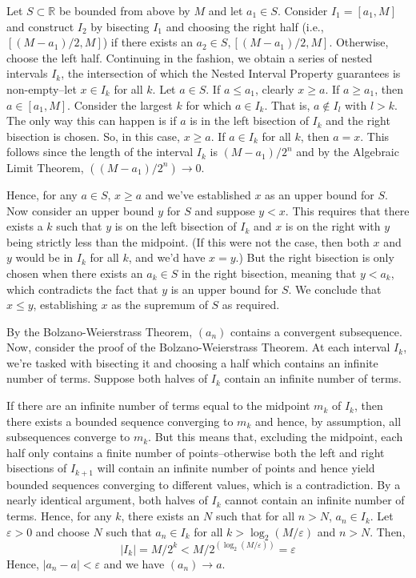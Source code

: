 \documentclass[a4paper]{report}
\newenvironment{ex}[1]
    {\noindent{\large \bf Exercise #1.}}{\vspace{0.5cm}}
\begin{document}
\begin{ex}{2.5.4}
  Let $S \subset \mathbb{R}$ be bounded from above by $M$ and let $a_1 \in S$. Consider $I_1 = [a_1 , M]$ and construct
  $I_2$ by bisecting $I_1$ and choosing the right half (i.e., $[(M-a_1)/2, M]$) if there exists an $a_2 \in S, [(M-a_1)/2, M]$. Otherwise, choose the left half. Continuing in the fashion, we obtain a series of nested intervals $I_k$, the intersection of which the Nested Interval Property guarantees is non-empty--let $x \in I_k$ for all $k$. Let $a \in S$. If $a \leq a_1$, clearly $x \geq a$. If $a \geq a_1$, then $a \in [a_1, M]$. Consider the largest $k$ for which
  $a \in I_k$. That is, $a \notin I_{l}$ with $l > k$. The only way this can happen is if $a$ is in the left bisection
  of $I_k$ and the right bisection is chosen. So, in this case, $x \geq a$. If $a \in I_k$ for all $k$, then $a = x$. This follows since the length of the interval $I_k$ is $(M-a_1)/2^n$ and by the Algebraic Limit Theorem, $\left((M-a_1)/2^n\right) \rightarrow 0$.

  Hence, for any $a \in S$, $x \geq a$ and we've established $x$ as an upper bound for $S$. Now consider an upper bound $y$ for $S$ and suppose $y < x$. This requires that there exists a $k$ such that $y$ is on the left bisection of $I_k$ and $x$ is on the right with $y$ being strictly less than the midpoint. (If this were not the case, then both $x$ and $y$ would be in $I_k$ for all $k$, and we'd have $x = y$.) But the right bisection is only chosen when there exists an $a_k \in S$ in the right bisection, meaning that $y < a_k$, which contradicts the fact that $y$ is an upper bound for $S$. We conclude that $x \leq y$, establishing $x$ as the supremum of $S$ as required.
\end{ex}

\begin{ex}{2.5.5}
  By the Bolzano-Weierstrass Theorem, $(a_n)$ contains a convergent subsequence. Now, consider the proof of the Bolzano-Weierstrass Theorem. At each interval $I_k$, we're tasked with bisecting it and choosing a half which contains an infinite number of terms. Suppose both halves of $I_k$ contain an infinite number of terms.

  If there are an infinite number of terms equal to the midpoint $m_k$ of $I_k$, then there exists a bounded sequence converging to $m_k$ and hence, by assumption, all subsequences converge to $m_k$. But this means that, excluding the midpoint, each half only contains a finite number of points--otherwise both the left and right bisections of $I_{k+1}$ will contain an infinite number of points and hence yield bounded sequences converging to different values, which is a contradiction. By a nearly identical argument, both halves of $I_k$ cannot contain an infinite number of terms. Hence, for any $k$, there exists an $N$ such that for all $n > N$, $a_n \in I_k$. Let $\varepsilon > 0$ and choose $N$ such that $a_n \in I_k$ for all $k > \log_2 (M/\varepsilon)$ and $n > N$. Then,
  \[
  |I_k| = M/2^k < M/2^{(\log_2(M/\varepsilon))} = \varepsilon
  \]
Hence, $|a_n - a| < \varepsilon$ and we have $(a_n) \rightarrow a$.
\end{ex}
\end{document}
